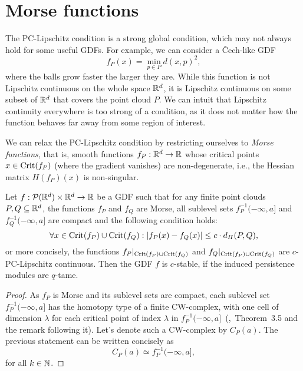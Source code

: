 \section{Morse functions}
The PC-Lipschitz condition is a strong global condition, which may not always
hold for some useful GDFs. For example, we can consider a \v{C}ech-like GDF
\begin{equation}
    f_P(x) = \min_{p \in P} d(x, p)^2,
\end{equation}
where the balls grow faster the larger they are. While this function is not
Lipschitz continuous on the whole space $\mathbb{R}^d$, it is Lipschitz continuous
on some subset of $\mathbb{R}^d$ that covers the point cloud $P$. We can intuit that
Lipschitz continuity everywhere is too strong of a condition, as it does not
matter how the function behaves far away from some region of interest.


We can relax the PC-Lipschitz condition by restricting ourselves to \emph{Morse
functions}, that is, smooth functions $f_P : \mathbb{R}^d \to \mathbb{R}$ whose critical points
$x \in \operatorname{Crit}(f_P)$ (where the gradient vanishes) are non-degenerate, i.e., the
Hessian matrix $H(f_P)(x)$ is non-singular.
\begin{theorem}
    Let $f : \mathcal{P}(\mathbb{R}^d) \times \mathbb{R}^d \to \mathbb{R}$ be a GDF such that for any
    finite point clouds $P, Q \subseteq \mathbb{R}^d$, the functions $f_P$ and $f_Q$ are
    Morse, all sublevel sets $f_P^{-1}(-\infty, a]$ and $f_Q^{-1}(-\infty, a]$
    are compact and the following condition holds:
    \begin{equation}
        \label{eq:morse_crit}
        \forall x \in \operatorname{Crit}(f_P) \cup \operatorname{Crit}(f_Q) :
        |f_P(x) - f_Q(x)| \leq c \cdot d_H(P, Q),
    \end{equation}
    or more concisely, the functions $f_P|_{\operatorname{Crit}(f_P) \cup \operatorname{Crit}(f_Q)}$ and
    $f_Q|_{\operatorname{Crit}(f_P) \cup \operatorname{Crit}(f_Q)}$ are $c$-PC-Lipschitz continuous.
    Then the GDF $f$ is $c$-stable, if the induced persistence modules are
    $q$-tame.
\end{theorem}
\begin{proof}
    As $f_P$ is Morse and its sublevel sets are compact, each sublevel set
    $f_P^{-1}(-\infty, a]$ has the homotopy type of a finite CW-complex, with
    one cell of dimension $\lambda$ for each critical point of index $\lambda$
    in $f_P^{-1}(-\infty, a]$~(\cite{milnor1963morse},~Theorem~3.5 and the
    remark following it). Let's denote such a CW-complex by $C_P(a)$. The
    previous statement can be written concisely as
    \begin{equation}
        C_P(a) \simeq f_P^{-1}(-\infty, a],
    \end{equation}
    for all $k \in \mathbb{N}$.
    \todo{}
\end{proof}